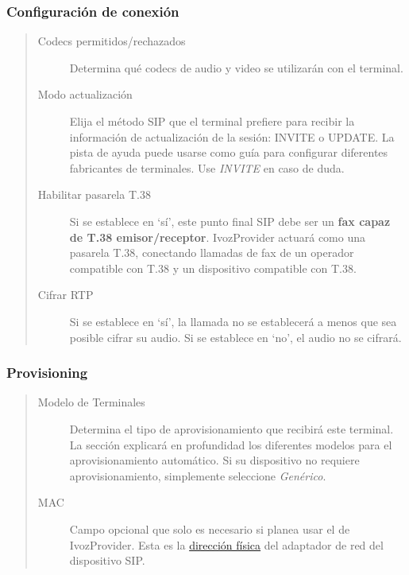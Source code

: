 \documentclass[letterpaper,10pt,spanish]{sphinxmanual}
\begin{document}
\subsubsection{Configuración de conexión}
\label{administration_portal/client/vpbx/terminals:connection-configuration}\begin{quote}
\begin{description}
\item[{Codecs permitidos/rechazados}] \leavevmode
Determina qué codecs de audio y video se utilizarán con el terminal.

\item[{Modo actualización}] \leavevmode
Elija el método SIP que el terminal prefiere para recibir la información de actualización de la sesión: INVITE o UPDATE. La pista de ayuda puede usarse como guía para configurar diferentes fabricantes de terminales. Use \emph{INVITE} en caso de duda.

\item[{Habilitar pasarela T.38}] \leavevmode
Si se establece en `sí', este punto final SIP debe ser un \textbf{fax capaz de T.38 emisor/receptor}. IvozProvider actuará como una pasarela T.38, conectando llamadas de fax de un operador compatible con T.38 y un dispositivo compatible con T.38.

\item[{Cifrar RTP}] \leavevmode
Si se establece en `sí', la llamada no se establecerá a menos que sea posible cifrar su audio. Si se establece en `no', el audio no se cifrará.

\end{description}
\end{quote}


\subsubsection{Provisioning}
\label{administration_portal/client/vpbx/terminals:provisioning}\begin{quote}
\begin{description}
\item[{Modelo de Terminales}] \leavevmode
Determina el tipo de aprovisionamiento que recibirá este terminal. La sección {\hyperref[administration_portal/platform/terminal_manufacturers:provisioning]{}} explicará en profundidad los diferentes modelos para el aprovisionamiento automático. Si su dispositivo no requiere aprovisionamiento, simplemente seleccione \emph{Genérico}.

\item[{MAC}] \leavevmode
Campo opcional que solo es necesario si planea usar el {\hyperref[administration_portal/platform/terminal_manufacturers:provisioning]{}} de IvozProvider. Esta es la \href{https://wikipedia.org/wiki/MAC\_Address}{dirección física} del adaptador de red del dispositivo SIP.

\end{description}
\end{quote}
\end{document}
